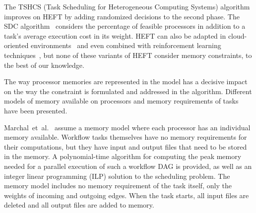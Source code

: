 \documentclass[conference]{IEEEtran}
\newcommand{\new}[1]{{\color{blue}#1}}
\begin{document}
The TSHCS (Task Scheduling for Heterogeneous Computing Systems) algorithm~\cite{alebrahim2017task} 
improves on HEFT by adding randomized decisions to the second phase.
The SDC algorithm~\cite{SHI2006665} considers the percentage of feasible processors in addition to a task’s
average execution cost in its weight.
HEFT  can also be adapted in cloud-oriented environments~\cite{samadi2018eheft} and even combined with reinforcement learning techniques~\cite{yano2022cqga}, but none of these variants of HEFT consider memory constraints, 
to the best of our knowledge. 

\medskip
{}
%
The way processor memories are represented in the model has a decisive impact on the way the constraint
is formulated and addressed in the algorithm.
%
Different models of memory available on processors and memory requirements of tasks have been presented.

Marchal~et~al.~\cite{marchal2018parallel} assume a memory model where each processor has an individual memory available.
\new{Workflow tasks themselves have no memory requirements for their computations,
but they have input and output files that need to be stored in the memory.}
A polynomial-time algorithm for computing the peak memory needed for a parallel execution of such a workflow DAG is provided,
as well as an integer linear programming (ILP) solution to the scheduling problem.
The memory model \new{ includes no memory requirement of the task itself, only the weights of incoming and outgoing edges.
When the task starts, all input files are deleted  and all output files are added to memory.}
\end{document}
